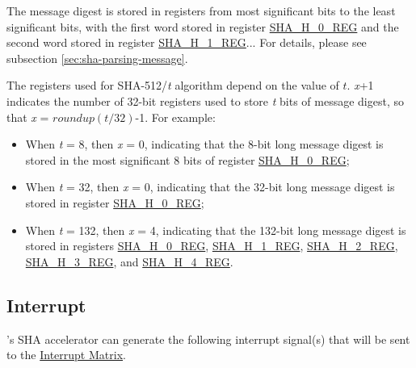 \documentclass[main\_\_EN.tex]{subfiles}
\begin{document}
\begin{table}[H]
\begin{threeparttable}
    \begin{tablenotes}
        \item[1] The message digest is stored in registers from most significant bits to the least significant bits, with the first word stored in register \hyperref[regdesc:SHAHNREG]{SHA\_H\_0\_REG} and the second word stored in register \hyperref[regdesc:SHAHNREG]{SHA\_H\_1\_REG}... For details, please see subsection \ref{sec:sha-parsing-message}.
        \item[2] The registers used for SHA-512/{\it{t}} algorithm depend on the value of \begin{math}t\end{math}. {\it{x}}+1 indicates the number of 32-bit registers used to store {\it{t}} bits of message digest, so that {\it{x}} = \begin{math}roundup(t/32)\end{math}-1. For example:
            \begin{itemize}
                \item When {\it{t}} = 8, then {\it{x}} = 0, indicating that the 8-bit long message digest is stored in the most significant 8 bits of register \hyperref[regdesc:SHAHNREG]{SHA\_H\_0\_REG};
                \item When {\it{t}} = 32, then {\it{x}} = 0, indicating that the 32-bit long message digest is stored in register \hyperref[regdesc:SHAHNREG]{SHA\_H\_0\_REG};
                \item When {\it{t}} = 132, then {\it{x}} = 4, indicating that the 132-bit long message digest is stored in registers \hyperref[regdesc:SHAHNREG]{SHA\_H\_0\_REG}, \hyperref[regdesc:SHAHNREG]{SHA\_H\_1\_REG}, \hyperref[regdesc:SHAHNREG]{SHA\_H\_2\_REG}, \hyperref[regdesc:SHAHNREG]{SHA\_H\_3\_REG}, and \hyperref[regdesc:SHAHNREG]{SHA\_H\_4\_REG}.
            \end{itemize}
    \end{tablenotes}

    \end{threeparttable}
\end{table}



\subsection{Interrupt}


\chipname{}'s SHA accelerator can generate the following interrupt signal(s) that will be sent to the \hyperref[mod:intmtrx]{Interrupt Matrix}.
\end{document}
